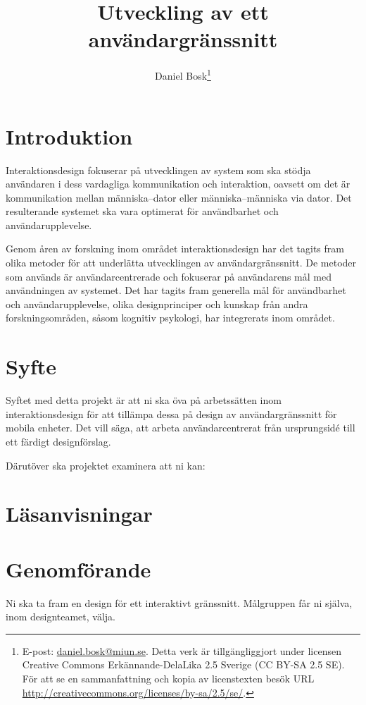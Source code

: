 \documentclass[a4paper,logo,nocourse]{miunasgn}
\title{Utveckling av ett användargränssnitt}
\author{Daniel Bosk\footnote{%
	E-post: \href{mailto:daniel.bosk@miun.se}{daniel.bosk@miun.se}.
  Detta verk är tillgängliggjort under licensen Creative Commons 
  Erkännande-DelaLika 2.5 Sverige (CC BY-SA 2.5 SE).
	För att se en sammanfattning och kopia av licenstexten besök URL 
	\url{http://creativecommons.org/licenses/by-sa/2.5/se/}.
}}
\date{\svnId}
\begin{document}
\maketitle
\thispagestyle{foot}
\tableofcontents


\section{Introduktion}
\label{sec:Introduktion}
Interaktionsdesign fokuserar på utvecklingen av system som ska stödja 
användaren i dess vardagliga kommunikation och interaktion, oavsett om det är 
kommunikation mellan människa--dator eller människa--människa via dator.
Det resulterande systemet ska vara optimerat för användbarhet och 
användarupplevelse.

Genom åren av forskning inom området interaktionsdesign har det tagits fram 
olika metoder för att underlätta utvecklingen av användargränssnitt.
De metoder som används är användarcentrerade och fokuserar på användarens mål 
med användningen av systemet.
Det har tagits fram generella mål för användbarhet och användarupplevelse, 
olika designprinciper och kunskap från andra forskningsområden, såsom kognitiv 
psykologi, har integrerats inom området.


\section{Syfte}
\label{sec:Syfte}
Syftet med detta projekt är att ni ska öva på arbetssätten inom 
interaktionsdesign för att tillämpa dessa på design av användargränssnitt för 
mobila enheter.
Det vill säga, att arbeta användarcentrerat från ursprungsidé till ett färdigt 
designförslag.

Därutöver ska projektet examinera att ni kan:
\begin{itemize}
  
\end{itemize}


\section{Läsanvisningar}
\label{sec:Lasanvisningar}



\section{Genomförande}
\label{sec:Genomforande}
Ni ska ta fram en design för ett interaktivt gränssnitt.
Målgruppen får ni själva, inom designteamet, välja.
\end{document}
